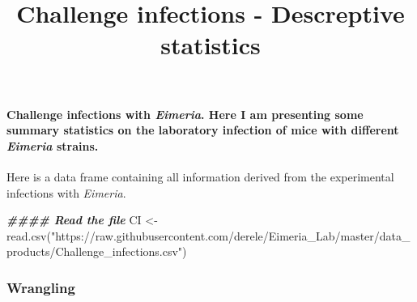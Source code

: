 \documentclass[
]{article}
\title{Challenge infections - Descreptive statistics}
\author{}
\date{\vspace{-2.5em}}
\newenvironment{Shaded}{\begin{snugshade}}{\end{snugshade}}
\newcommand{\DocumentationTok}[1]{\textcolor[rgb]{0.56,0.35,0.01}{\textbf{\textit{#1}}}}
\newcommand{\FunctionTok}[1]{\textcolor[rgb]{0.00,0.00,0.00}{#1}}
\newcommand{\NormalTok}[1]{#1}
\newcommand{\OtherTok}[1]{\textcolor[rgb]{0.56,0.35,0.01}{#1}}
\newcommand{\StringTok}[1]{\textcolor[rgb]{0.31,0.60,0.02}{#1}}
\begin{document}
\maketitle

\hypertarget{challenge-infections-with-eimeria.-here-i-am-presenting-some-summary-statistics-on-the-laboratory-infection-of-mice-with-different-eimeria-strains.}{%
\paragraph{\texorpdfstring{Challenge infections with \emph{Eimeria}.
Here I am presenting some summary statistics on the laboratory infection
of mice with different \emph{Eimeria}
strains.}{Challenge infections with Eimeria. Here I am presenting some summary statistics on the laboratory infection of mice with different Eimeria strains.}}\label{challenge-infections-with-eimeria.-here-i-am-presenting-some-summary-statistics-on-the-laboratory-infection-of-mice-with-different-eimeria-strains.}}

Here is a data frame containing all information derived from the
experimental infections with \emph{Eimeria}.

\begin{Shaded}
\begin{Highlighting}[]
\DocumentationTok{\#\#\#\# Read the file}
\NormalTok{CI }\OtherTok{\textless{}{-}} \FunctionTok{read.csv}\NormalTok{(}\StringTok{"https://raw.githubusercontent.com/derele/Eimeria\_Lab/master/data\_products/Challenge\_infections.csv"}\NormalTok{)}
\end{Highlighting}
\end{Shaded}

\hypertarget{wrangling}{%
\subsubsection{Wrangling}\label{wrangling}}
\end{document}
